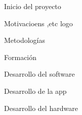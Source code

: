 
Inicio del proyecto

Motivacioens ,etc
logo

Metodologías


Formación


Desarrollo del software

Desarrollo de la app


Desarrollo del hardware
